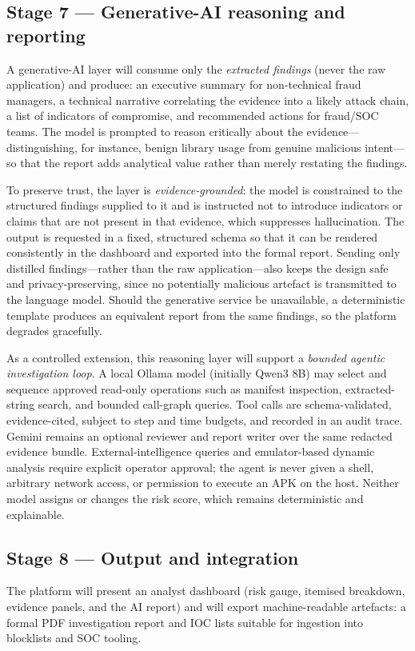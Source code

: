 \documentclass[11pt,a4paper]{article}
\begin{document}
\subsection{Stage 7 --- Generative-AI reasoning and reporting}
A generative-AI layer will consume only the \emph{extracted findings} (never the raw
application) and produce: an executive summary for non-technical fraud managers, a
technical narrative correlating the evidence into a likely attack chain, a list of
indicators of compromise, and recommended actions for fraud/SOC teams. The model is
prompted to reason critically about the evidence---distinguishing, for instance, benign
library usage from genuine malicious intent---so that the report adds analytical value
rather than merely restating the findings.

To preserve trust, the layer is \emph{evidence-grounded}: the model is constrained to the
structured findings supplied to it and is instructed not to introduce indicators or
claims that are not present in that evidence, which suppresses hallucination. The output
is requested in a fixed, structured schema so that it can be rendered consistently in the
dashboard and exported into the formal report. Sending only distilled findings---rather
than the raw application---also keeps the design safe and privacy-preserving, since no
potentially malicious artefact is transmitted to the language model. Should the
generative service be unavailable, a deterministic template produces an equivalent report
from the same findings, so the platform degrades gracefully.

As a controlled extension, this reasoning layer will support a \emph{bounded agentic
investigation loop}. A local Ollama model (initially Qwen3 8B) may select and sequence
approved read-only operations such as manifest inspection, extracted-string search, and
bounded call-graph queries. Tool calls are schema-validated, evidence-cited, subject to
step and time budgets, and recorded in an audit trace. Gemini remains an optional
reviewer and report writer over the same redacted evidence bundle. External-intelligence
queries and emulator-based dynamic analysis require explicit operator approval; the
agent is never given a shell, arbitrary network access, or permission to execute an APK
on the host. Neither model assigns or changes the risk score, which remains deterministic
and explainable.

\subsection{Stage 8 --- Output and integration}
The platform will present an analyst dashboard (risk gauge, itemised breakdown, evidence
panels, and the AI report) and will export machine-readable artefacts: a formal PDF
investigation report and IOC lists suitable for ingestion into blocklists and SOC
tooling.
\end{document}
